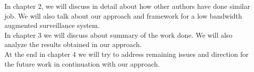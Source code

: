 In chapter 2, we will discuss in detail about how other authors have
done similar job. We will also talk about our approach and framework for
a low bandwidth augmented surveillance system.\\

In chapter 3 we will discuss about summary of the work done. We will
also analyze the results obtained in our approach.\\

At the end in chapter 4 we will try to address remaining issues and
direction for the future work in continuation with our approach.\\

